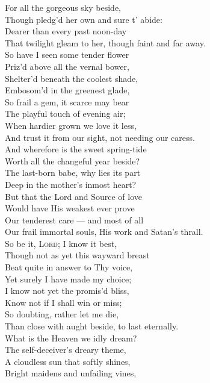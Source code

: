  For all the gorgeous sky beside, \\
 Though pledg’d her own and sure t’ abide: \\
 Dearer than every past noon-day \\
 That twilight gleam to her, though faint and far away. \\
  So have I seen some tender flower \\
 Priz’d above all the vernal bower, \\
 Shelter’d beneath the coolest shade, \\
 Embosom’d in the greenest glade, \\
 So frail a gem, it scarce may bear \\
 The playful touch of evening air; \\
 When hardier grown we love it less, \\
 And trust it from our sight, not needing our caress. \\
  And wherefore is the sweet spring-tide \\
 Worth all the changeful year beside? \\
 The last-born babe, why lies its part \\
 Deep in the mother’s inmost heart? \\
 But that the Lord and Source of love \\
 Would have His weakest ever prove \\
 Our tenderest care — and most of all \\
 Our frail immortal souls, His work and Satan’s thrall. \\
  So be it, \textsc{Lord}; I know it best, \\
 Though not as yet this wayward breast \\
 Beat quite in answer to Thy voice, \\
 Yet surely I have made my choice; \\
 I know not yet the promis’d bliss, \\
 Know not if I shall win or miss; \\
 So doubting, rather let me die, \\
 Than close with aught beside, to last eternally. \\
  What is the Heaven we idly dream? \\
 The self-deceiver’s dreary theme, \\
 A cloudless sun that softly shines, \\
 Bright maidens and unfailing vines, \\
